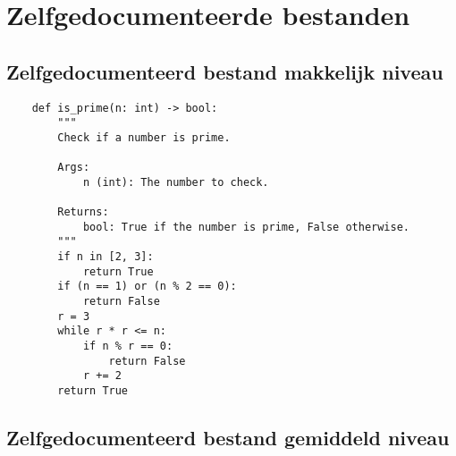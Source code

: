 \section{Zelfgedocumenteerde bestanden}

\subsection{Zelfgedocumenteerd bestand makkelijk niveau}
\label{bijlage:zelfgedocumenteerd-bestand-makkelijk}

\begin{verbatim}
    def is_prime(n: int) -> bool:
        """
        Check if a number is prime.
        
        Args:
            n (int): The number to check.
        
        Returns:
            bool: True if the number is prime, False otherwise.
        """
        if n in [2, 3]:
            return True
        if (n == 1) or (n % 2 == 0):
            return False
        r = 3
        while r * r <= n:
            if n % r == 0:
                return False
            r += 2
        return True
\end{verbatim}

\subsection{Zelfgedocumenteerd bestand gemiddeld niveau}
\label{bijlage:zelfgedocumenteerd-bestand}

